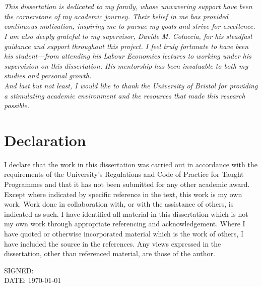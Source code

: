 \documentclass[12pt]{article}
\begin{document}
\section*{} %
\noindent \textit{This dissertation is dedicated to my family, whose unwavering support have been the cornerstone of my academic journey. Their belief in me has provided continuous motivation, inspiring me to pursue my goals and strive for excellence.\\
I am also deeply grateful to my supervisor, Davide M. Coluccia, for his steadfast guidance and support throughout this project. I feel truly fortunate to have been his student—from attending his Labour Economics lectures to working under his supervision on this dissertation. His mentorship has been invaluable to both my studies and personal growth.\\
And last but not least, I would like to thank the University of Bristol for providing a stimulating academic environment and the resources that made this research possible.}
\setcounter{page}{0}
\thispagestyle{empty}
\clearpage

\section*{Declaration}
\noindent
I declare that the work in this dissertation was carried out in accordance with the requirements of the University's Regulations and Code of Practice for Taught Programmes and that it has not been submitted for any other academic award. Except where indicated by specific reference in the text, this work is my own work. Work done in collaboration with, or with the assistance of others, is indicated as such. I have identified all material in this dissertation which is not my own work through appropriate referencing and acknowledgement. Where I have quoted or otherwise incorporated material which is the work of others, I have included the source in the references. Any views expressed in the dissertation, other than referenced material, are those of the author.

\vspace{1.5cm}

SIGNED: \\

DATE: \today
\setcounter{page}{0}
\thispagestyle{empty}
\clearpage


\renewcommand{\contentsname}{Table of Contents}
\tableofcontents
\setcounter{page}{0}
\thispagestyle{empty}
\clearpage
\end{document}
